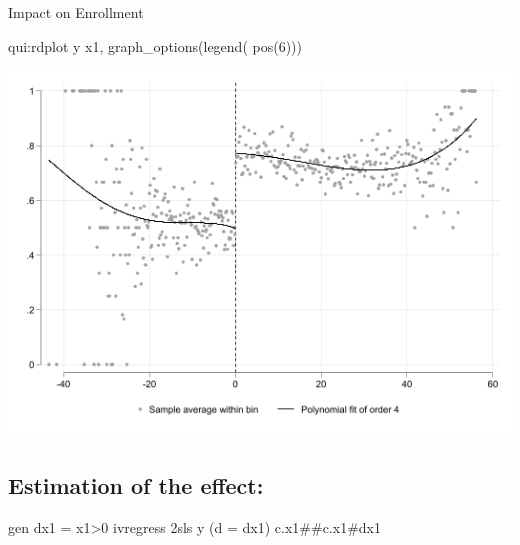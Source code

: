\documentclass[
  letterpaper,
  DIV=11,
  numbers=noendperiod]{scrartcl}
\newenvironment{Shaded}{\begin{snugshade}}{\end{snugshade}}
\newcommand{\BaseNTok}[1]{\textcolor[rgb]{0.68,0.00,0.00}{#1}}
\newcommand{\FunctionTok}[1]{\textcolor[rgb]{0.28,0.35,0.67}{#1}}
\newcommand{\KeywordTok}[1]{\textcolor[rgb]{0.00,0.23,0.31}{#1}}
\newcommand{\NormalTok}[1]{\textcolor[rgb]{0.00,0.23,0.31}{#1}}
\begin{document}
Impact on Enrollment

\begin{Shaded}
\begin{Highlighting}[]
\KeywordTok{qui}\NormalTok{:rdplot }\FunctionTok{y}\NormalTok{ x1, graph\_options(}\BaseNTok{legend}\NormalTok{( pos(6)))}
\end{Highlighting}
\end{Shaded}

\includegraphics{11rdd_files/figure-pdf/cell-10-output-1.png}

\subsection{Estimation of the effect:}\label{estimation-of-the-effect}

\begin{Shaded}
\begin{Highlighting}[]
\KeywordTok{gen}\NormalTok{ dx1 = x1\textgreater{}0}
\NormalTok{ivregress 2sls }\FunctionTok{y}\NormalTok{ (}\KeywordTok{d}\NormalTok{ = dx1) c.x1\#\#c.x1\#dx1 }
\end{Highlighting}
\end{Shaded}
\end{document}
